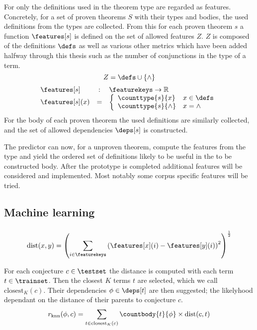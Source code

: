 For \roerei only the definitions used in the theorem type are regarded as features.
Concretely, for a set of proven theorems $S$ with their types and bodies, the used definitions from the types are collected.
From this for each proven theorem $s$ a function $\features[s]$ is defined on the set of allowed features $Z$.
$Z$ is composed of the definitions $\defs$ as well as various other metrics which have been added halfway through this thesis such as the number of conjunctions in the type of a term.
$$ Z = \defs \cup \{ \wedge \} $$
$$
\begin{array}{lcl}
	\features[s] & : & \featurekeys \rightarrow \mathbb{R} \\
	\features[s](x) & = & \left\{
		\begin{array}{ll}
			\counttype{s}{x} & x \in \defs \\
			\counttype{s}{\wedge} & x = \wedge
		\end{array} \right.
\end{array}
$$
For the body of each proven theorem the used definitions are similarly collected, and the set of allowed dependencies $\deps[s]$ is constructed.

The predictor can now, for a unproven theorem, compute the features from the type and yield the ordered set of definitions likely to be useful in the to be constructed body.
After the prototype is completed additional features will be considered and implemented.
Most notably some corpus specific features will be tried.

\subsection{Machine learning}

\subsubsection{\knn}
$$ \text{dist}(x, y) = \left( \sum_{i \in \featurekeys} \left( \features[x](i) - \features[y](i) \right)^2 \right)^{\frac{1}{2}} $$

For each conjecture $c \in \testset$ the distance is computed with each term $t \in \trainset$.
Then the closest $K$ terms $t$ are selected, which we call $\text{closest}_K(c)$.
Their dependencies $\phi \in \deps[t]$ are then suggested; the likelyhood dependant on the distance of their parents to conjecture $c$.
\[ r_\text{knn}(\phi, c) = \sum_{t \in \text{closest}_K(c)} \countbody{t}{\phi} \times \text{dist}(c, t) \]

